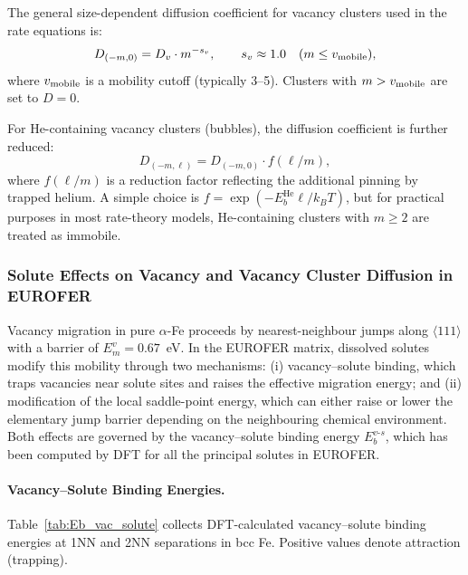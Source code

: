 \documentclass[pdflatex,sn-basic]{sn-jnl} %
\begin{document}
The general size-dependent diffusion coefficient for vacancy clusters used in
the rate equations is:
\begin{equation}\label{eq:Dm}
    D_{(-m,0)} = D_v \cdot m^{-s_v}, \qquad s_v \approx 1.0 \quad (m \leq v_{\rm mobile}),
\end{equation}
where $v_{\rm mobile}$ is a mobility cutoff (typically 3--5). Clusters with $m >
v_{\rm mobile}$ are set to $D = 0$.

For He-containing vacancy clusters (bubbles), the diffusion coefficient is
further reduced:
\begin{equation}\label{eq:Dml}
    D_{(-m,\ell)} = D_{(-m,0)} \cdot f(\ell/m),
\end{equation}
where $f(\ell/m)$ is a reduction factor reflecting the additional pinning by
trapped helium. A simple choice is $f = \exp(-E_b^{\mathrm{He}}\ell/k_BT)$, but
for practical purposes in most rate-theory models, He-containing clusters with
$m \geq 2$ are treated as immobile.

\subsubsection{Solute Effects on Vacancy and Vacancy Cluster Diffusion in EUROFER}
\label{sec:vac_solute_eurofer}

Vacancy migration in pure $\alpha$-Fe proceeds by nearest-neighbour jumps along
$\langle111\rangle$ with a barrier of $E_m^v = 0.67$~eV. In the EUROFER matrix,
dissolved solutes modify this mobility through two mechanisms: (i) vacancy--solute
binding, which traps vacancies near solute sites and raises the effective
migration energy; and (ii) modification of the local saddle-point energy, which
can either raise or lower the elementary jump barrier depending on the
neighbouring chemical environment. Both effects are governed by the
vacancy--solute binding energy $E_b^{v\text{-}s}$, which has been computed by
DFT for all the principal solutes in EUROFER.

\paragraph{Vacancy--Solute Binding Energies.}

Table~\ref{tab:Eb_vac_solute} collects DFT-calculated vacancy--solute binding
energies at 1NN and 2NN separations in bcc Fe. Positive values denote
attraction (trapping).
\end{document}
